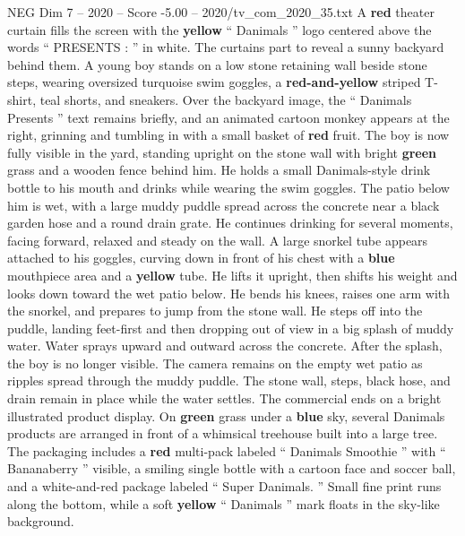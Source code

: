 \begin{textsample}{NEG Dim 7 – 2020 – Score -5.00 – 2020/tv\_com\_2020\_35.txt}  \label{ex:f7_neg_005}
A \textbf{red} theater curtain fills the screen with the \textbf{yellow} “ Danimals ” logo centered above the words “ PRESENTS : ” in white.
The curtains part to reveal a sunny backyard behind them.
A young boy stands on a low stone retaining wall beside stone steps, wearing oversized turquoise swim goggles, a \textbf{red-and-yellow} striped T-shirt, teal shorts, and sneakers.
Over the backyard image, the “ Danimals Presents ” text remains briefly, and an animated cartoon monkey appears at the right, grinning and tumbling in with a small basket of \textbf{red} fruit.
The boy is now fully visible in the yard, standing upright on the stone wall with bright \textbf{green} grass and a wooden fence behind him.
He holds a small Danimals-style drink bottle to his mouth and drinks while wearing the swim goggles.
The patio below him is wet, with a large muddy puddle spread across the concrete near a black garden hose and a round drain grate.
He continues drinking for several moments, facing forward, relaxed and steady on the wall.
A large snorkel tube appears attached to his goggles, curving down in front of his chest with a \textbf{blue} mouthpiece area and a \textbf{yellow} tube.
He lifts it upright, then shifts his weight and looks down toward the wet patio below.
He bends his knees, raises one arm with the snorkel, and prepares to jump from the stone wall.
He steps off into the puddle, landing feet-first and then dropping out of view in a big splash of muddy water.
Water sprays upward and outward across the concrete.
After the splash, the boy is no longer visible.
The camera remains on the empty wet patio as ripples spread through the muddy puddle.
The stone wall, steps, black hose, and drain remain in place while the water settles.
The commercial ends on a bright illustrated product display.
On \textbf{green} grass under a \textbf{blue} sky, several Danimals products are arranged in front of a whimsical treehouse built into a large tree.
The packaging includes a \textbf{red} multi-pack labeled “ Danimals Smoothie ” with “ Bananaberry ” visible, a smiling single bottle with a cartoon face and soccer ball, and a white-and-red package labeled “ Super Danimals. ” Small fine print runs along the bottom, while a soft \textbf{yellow} “ Danimals ” mark floats in the sky-like background.

\end{textsample}
